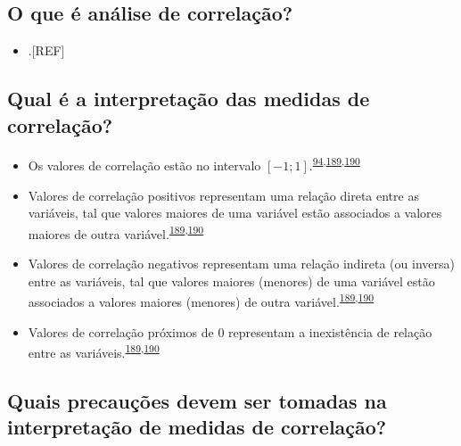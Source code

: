 \documentclass[
  a4paper,
]{book}
\providecommand{\tightlist}{%
  \setlength{\itemsep}{0pt}\setlength{\parskip}{0pt}}
\begin{document}
\hypertarget{o-que-uxe9-anuxe1lise-de-correlauxe7uxe3o}{%
\subsection{O que é análise de correlação?}\label{o-que-uxe9-anuxe1lise-de-correlauxe7uxe3o}}

\begin{itemize}
\tightlist
\item
  .{[}REF{]}
\end{itemize}

\hypertarget{qual-uxe9-a-interpretauxe7uxe3o-das-medidas-de-correlauxe7uxe3o}{%
\subsection{Qual é a interpretação das medidas de correlação?}\label{qual-uxe9-a-interpretauxe7uxe3o-das-medidas-de-correlauxe7uxe3o}}

\begin{itemize}
\item
  Os valores de correlação estão no intervalo \([-1; 1]\).\textsuperscript{\protect\hyperlink{ref-barkan2015}{94},\protect\hyperlink{ref-khamis2008}{189},\protect\hyperlink{ref-allison2022}{190}}
\item
  Valores de correlação positivos representam uma relação direta entre as variáveis, tal que valores maiores de uma variável estão associados a valores maiores de outra variável.\textsuperscript{\protect\hyperlink{ref-khamis2008}{189},\protect\hyperlink{ref-allison2022}{190}}
\item
  Valores de correlação negativos representam uma relação indireta (ou inversa) entre as variáveis, tal que valores maiores (menores) de uma variável estão associados a valores maiores (menores) de outra variável.\textsuperscript{\protect\hyperlink{ref-khamis2008}{189},\protect\hyperlink{ref-allison2022}{190}}
\item
  Valores de correlação próximos de \(0\) representam a inexistência de relação entre as variáveis.\textsuperscript{\protect\hyperlink{ref-khamis2008}{189},\protect\hyperlink{ref-allison2022}{190}}
\end{itemize}

\hypertarget{quais-precauuxe7uxf5es-devem-ser-tomadas-na-interpretauxe7uxe3o-de-medidas-de-correlauxe7uxe3o}{%
\subsection{Quais precauções devem ser tomadas na interpretação de medidas de correlação?}\label{quais-precauuxe7uxf5es-devem-ser-tomadas-na-interpretauxe7uxe3o-de-medidas-de-correlauxe7uxe3o}}
\end{document}

